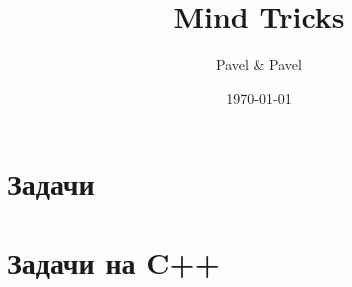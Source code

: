 \documentclass[12pt]{report}
\title{\bf Mind Tricks}
\author{Pavel \& Pavel}
\date{\today}
\begin{document}
\maketitle
\tableofcontents
\chapter{Задачи}



\chapter{Задачи на C++}
\setcounter{problem}{0}

\end{document}
